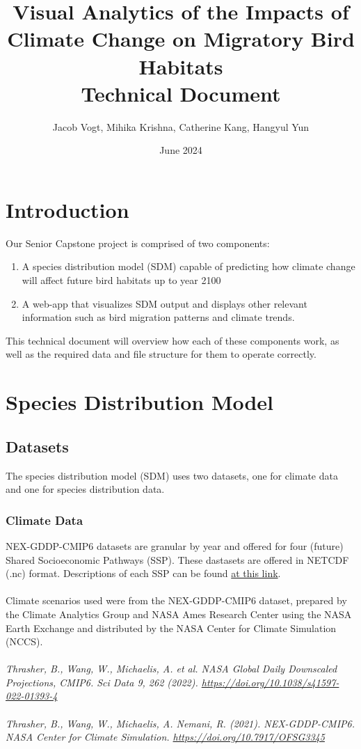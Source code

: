 \documentclass{article}
\title{Visual Analytics of the Impacts of Climate Change on 
Migratory Bird Habitats \\
 \Large{Technical Document}}
\author{Jacob Vogt, Mihika Krishna, Catherine Kang, Hangyul Yun}
\affil{Professor Dongyu Liu}
\affil{University of California, Davis}
\date{June 2024}
\begin{document}
\maketitle

\tableofcontents

\newpage

\section*{Introduction}
Our Senior Capstone project is comprised of two components:

\begin{enumerate}
  \item A species distribution model (SDM) capable of predicting how climate change will affect future bird habitats up to year 2100
  \item A web-app that visualizes SDM output and displays other relevant information such as bird migration patterns and climate trends.
\end{enumerate}

This technical document will overview how each of these components work, as well as the required data and file structure for them to operate correctly.

\section{Species Distribution Model}

\subsection{Datasets}

The species distribution model (SDM) uses two datasets, one for climate data and one for species distribution data.

\subsubsection*{Climate Data}

NEX-GDDP-CMIP6 datasets are granular by year and offered for four (future) Shared Socioeconomic Pathways (SSP). These dastasets are offered in NETCDF (.nc) format. 
Descriptions of each SSP can be found \href{https://www.carbonbrief.org/explainer-how-shared-socioeconomic-pathways-explore-future-climate-change/}{at this link}.
\\\\
Climate scenarios used were from the NEX-GDDP-CMIP6 dataset, prepared by the
Climate Analytics Group and NASA Ames Research Center using the NASA Earth
Exchange and distributed by the NASA Center for Climate Simulation (NCCS).
\\\\
\textit{
Thrasher, B., Wang, W., Michaelis, A. et al. NASA Global Daily Downscaled
Projections, CMIP6. Sci Data 9, 262 (2022). \url{https://doi.org/10.1038/s41597-022-01393-4}
\\\\
Thrasher, B., Wang, W., Michaelis, A. Nemani, R. (2021). NEX-GDDP-CMIP6. NASA
Center for Climate Simulation. \url{https://doi.org/10.7917/OFSG3345}}
\end{document}
